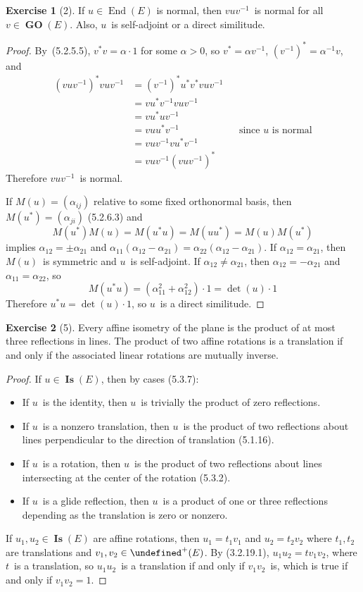 \documentclass[letterpaper,12pt]{article}
\newcommand{\mult}{\cdot}
\let\O\undefined %
\DeclareMathOperator{\End}{End}
\DeclareMathOperator{\GO}{\mathbf{GO}}
\DeclareMathOperator{\O}{\mathbf{O}}
\DeclareMathOperator{\Op}{\O^+}
\DeclareMathOperator{\Is}{\mathbf{Is}}
\newcommand{\inv}[1]{#1^{-1}}
\newcommand{\adj}[1]{#1^*}
\theoremstyle{definition}
\newtheorem*{exer}{Exercise}
\theoremstyle{remark}
\begin{document}
\begin{exer}[2]
If \(u\in\End(E)\) is normal, then \(vu\inv{v}\)~is normal for all \(v\in\GO(E)\). Also, \(u\)~is self-adjoint or a direct similitude.
\end{exer}
\begin{proof}
By~(5.2.5.5), \(\adj{v}v=\alpha\mult 1\) for some \(\alpha>0\), so \(\adj{v}=\alpha\inv{v}\), \(\adj{(\inv{v})}=\alpha^{-1}v\), and
\begin{align*}
\adj{(vu\inv{v})}vu\inv{v}&=\adj{(\inv{v})}\adj{u}\adj{v}vu\inv{v}&&\\
	&=v\adj{u}\inv{v}vu\inv{v}&&\\
	&=v\adj{u}u\inv{v}&&\\
	&=vu\adj{u}\inv{v}&&\text{since \(u\)~is normal}\\
	&=vu\inv{v}v\adj{u}\inv{v}&&\\
	&=vu\inv{v}\adj{(vu\inv{v})}
\end{align*}
Therefore \(vu\inv{v}\)~is normal.

If \(M(u)=(\alpha_{ij})\) relative to some fixed orthonormal basis, then \(M(\adj{u})=(\alpha_{ji})\) (5.2.6.3) and
\[M(\adj{u})M(u)=M(\adj{u}u)=M(u\adj{u})=M(u)M(\adj{u})\]
implies \(\alpha_{12}=\pm\alpha_{21}\) and \(\alpha_{11}(\alpha_{12}-\alpha_{21})=\alpha_{22}(\alpha_{12}-\alpha_{21})\). If \(\alpha_{12}=\alpha_{21}\), then \(M(u)\)~is symmetric and \(u\)~is self-adjoint. If \(\alpha_{12}\ne\alpha_{21}\), then \(\alpha_{12}=-\alpha_{21}\) and \(\alpha_{11}=\alpha_{22}\), so
\[M(\adj{u}u)=(\alpha_{11}^2+\alpha_{12}^2)\mult 1=\det(u)\mult 1\]
Therefore \(\adj{u}u=\det(u)\mult 1\), so \(u\)~is a direct similitude.
\end{proof}

\begin{exer}[5]
Every affine isometry of the plane is the product of at most three reflections in lines. The product of two affine rotations is a translation if and only if the associated linear rotations are mutually inverse.
\end{exer}
\begin{proof}
If \(u\in\Is(E)\), then by cases (5.3.7):
\begin{itemize}[itemsep=0pt]
\item If \(u\)~is the identity, then \(u\)~is trivially the product of zero reflections.
\item If \(u\)~is a nonzero translation, then \(u\)~is the product of two reflections about lines perpendicular to the direction of translation (5.1.16).
\item If \(u\)~is a rotation, then \(u\)~is the product of two reflections about lines intersecting at the center of the rotation (5.3.2).
\item If \(u\)~is a glide reflection, then \(u\)~is a product of one or three reflections depending as the translation is zero or nonzero.
\end{itemize}
If \(u_1,u_2\in\Is(E)\) are affine rotations, then \(u_1=t_1v_1\) and \(u_2=t_2v_2\) where \(t_1,t_2\) are translations and \(v_1,v_2\in\Op(E)\). By (3.2.19.1), \(u_1u_2=tv_1v_2\), where \(t\)~is a translation, so \(u_1u_2\)~is a translation if and only if \(v_1v_2\)~is, which is true if and only if \(v_1v_2=1\).
\end{proof}
\end{document}
